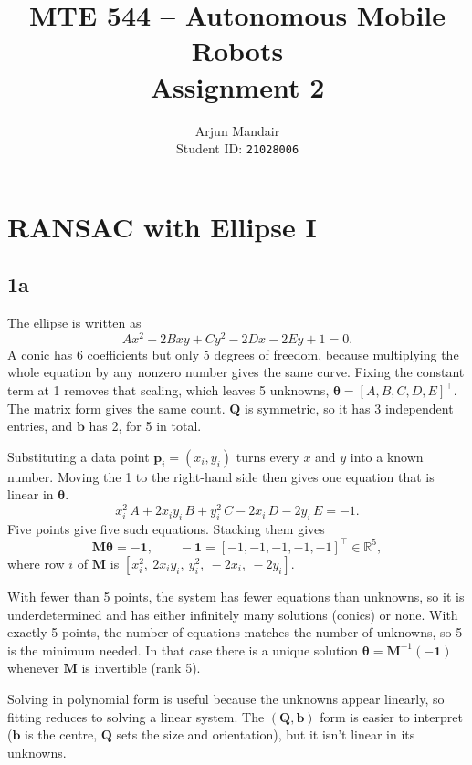 \documentclass[11pt]{article}
\title{MTE 544 -- Autonomous Mobile Robots\\Assignment 2}
\author{Arjun Mandair \\ Student ID: \texttt{21028006}}
\date{}
\newcommand{\vect}[1]{\mathbf{#1}}
\newcommand{\mat}[1]{\mathbf{#1}}
\begin{document}
\maketitle
\thispagestyle{fancy}

\clearpage
\section{RANSAC with Ellipse I}

\subsection*{1a}

The ellipse is written as
\begin{equation*}
    Ax^2 + 2Bxy + Cy^2 - 2Dx - 2Ey + 1 = 0.
\end{equation*}
A conic has 6 coefficients but only 5 degrees of freedom, because multiplying the whole equation by any nonzero number gives the same curve. Fixing the constant term at 1 removes that scaling, which leaves 5 unknowns, $\bm{\theta} = [A, B, C, D, E]^\top$. The matrix form gives the same count. $\mat{Q}$ is symmetric, so it has 3 independent entries, and $\vect{b}$ has 2, for 5 in total.

Substituting a data point $\vect{p}_i = (x_i, y_i)$ turns every $x$ and $y$ into a known number. Moving the 1 to the right-hand side then gives one equation that is linear in $\bm{\theta}$.
\begin{equation*}
    x_i^2\,A + 2x_iy_i\,B + y_i^2\,C - 2x_i\,D - 2y_i\,E = -1.
\end{equation*}
Five points give five such equations. Stacking them gives
\begin{equation*}
    \mat{M}\bm{\theta} = -\vect{1}, \qquad -\vect{1} = [-1, -1, -1, -1, -1]^\top \in \mathbb{R}^5,
\end{equation*}
where row $i$ of $\mat{M}$ is $[x_i^2,\ 2x_iy_i,\ y_i^2,\ -2x_i,\ -2y_i]$.

With fewer than 5 points, the system has fewer equations than unknowns, so it is underdetermined and has either infinitely many solutions (conics) or none. With exactly 5 points, the number of equations matches the number of unknowns, so 5 is the minimum needed. In that case there is a unique solution $\bm{\theta} = \mat{M}^{-1}(-\vect{1})$ whenever $\mat{M}$ is invertible (rank 5).

Solving in polynomial form is useful because the unknowns appear linearly, so fitting reduces to solving a linear system. The $(\mat{Q}, \vect{b})$ form is easier to interpret ($\vect{b}$ is the centre, $\mat{Q}$ sets the size and orientation), but it isn't linear in its unknowns.
\end{document}
